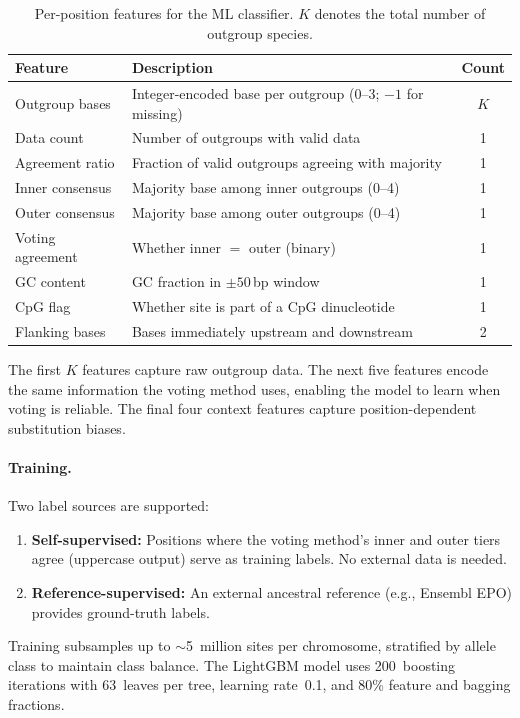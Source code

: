 \documentclass[11pt,a4paper]{article}
\begin{document}
\begin{table}[t]
\centering
\caption{Per-position features for the ML classifier. $K$ denotes the total
number of outgroup species.}
\label{tab:features}
\begin{tabular}{@{}lp{7.5cm}c@{}}
\toprule
Feature & Description & Count \\
\midrule
Outgroup bases & Integer-encoded base per outgroup (0--3; $-1$ for missing) & $K$ \\
Data count & Number of outgroups with valid data & 1 \\
Agreement ratio & Fraction of valid outgroups agreeing with majority & 1 \\
Inner consensus & Majority base among inner outgroups (0--4) & 1 \\
Outer consensus & Majority base among outer outgroups (0--4) & 1 \\
Voting agreement & Whether inner $=$ outer (binary) & 1 \\
GC content & GC fraction in $\pm 50$\,bp window & 1 \\
CpG flag & Whether site is part of a CpG dinucleotide & 1 \\
Flanking bases & Bases immediately upstream and downstream & 2 \\
\bottomrule
\end{tabular}
\end{table}

The first $K$ features capture raw outgroup data. The next five features
encode the same information the voting method uses, enabling the model to
learn when voting is reliable. The final four context features capture
position-dependent substitution biases.

\paragraph{Training.}
Two label sources are supported:

\begin{enumerate}
    \item \textbf{Self-supervised:} Positions where the voting method's inner
        and outer tiers agree (uppercase output) serve as training labels. No
        external data is needed.
    \item \textbf{Reference-supervised:} An external ancestral reference
        (e.g., Ensembl EPO) provides ground-truth labels.
\end{enumerate}

Training subsamples up to $\sim$5~million sites per chromosome, stratified by
allele class to maintain class balance. The LightGBM model uses 200~boosting
iterations with 63~leaves per tree, learning rate~0.1, and 80\% feature and
bagging fractions.
\end{document}
